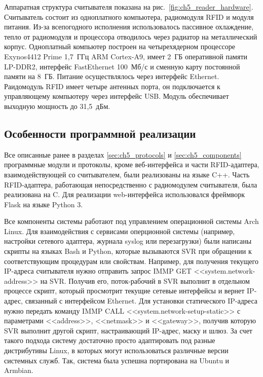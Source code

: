 Аппаратная структура считывателя показана на рис.~\ref{fig:ch5_reader_hardware}. Считыватель состоит из одноплатного компьютера, радиомодуля RFID и модуля питания. Из-за всепогодного исполнения использовалось пассивное охлаждение, тепло от радиомодуля и процессора отводилось через радиатор на металлический корпус. Одноплатный компьютер построен на четырехядерном процессоре Exynos4412 Prime 1,7~ГГц ARM Cortex-A9, имеет 2~ГБ оперативной памяти LP-DDR2, интерфейс FastEthernet 100~Мб/с и сменную карту постоянной памяти на 8~ГБ. Питание осуществлялось через интерфейс Ethernet. Раидомодуль RFID имеет четыре антенных порта, он подключается к управляющему компьютеру через интерфейс USB. Модуль обеспечивает выходную мощность до 31,5~дБм.



\subsection{Особенности программной реализации}\label{sec:ch5_implementation_software}
Все описанные ранее в разделах \ref{sec:ch5_protocols} и \ref{sec:ch5_components} программные модули и протоколы,  кроме веб-интерфейса и части RFID-адаптера, взаимодействующей со считывателем, были реализованы на языке C++. Часть RFID-адаптера, работающая непосредственно с радиомодулем считывателя, была реализована на C. Для реализации web-интерфейса использовался фреймворк Flask на языке Python 3.

Все компоненты системы работают под управлением операционной системы Arch Linux. Для взаимодействия с сервисами оперционной системы (например, настройки сетевого адаптера, журнала syslog или перезагрузки) были написаны скрипты на языках Bash и Python, которые вызываются SVR при обращении к соответствующим процедурам или свойствам. Например, для получения текущего IP-адреса считывателя нужно отправить запрос IMMP GET <<system.network-address>> на SVR. Получив его, поток-рабочий в SVR выполнит в отдельном процессе скрипт, который просмотрит текущие сетевые интерфейсы и вернет IP-адрес, связанный с интерфейсом Ethernet. Для установки статического IP-адреса нужно передать команду IMMP CALL <<system.network-setup-static>> с параметрами <<address>>, <<netmask>> и <<gateway>>, получив которую SVR выполнит другой скрипт, настраивающий IP-адрес, маску и шлюз. За счет такого подхода систему достаточно просто адаптировать под разные дистрибутивы Linux, в которых могут использоваться различные версии системных служб. Так, система была успешна портирована на Ubuntu и Armbian.

